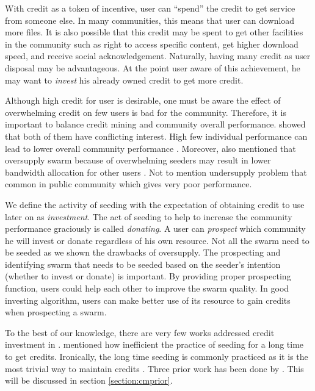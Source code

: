 With credit as a token of incentive, user can ``spend'' the credit to get service from someone else. In many communities, this means that user can download more files. It is also possible that this credit may be spent to get other facilities in the community such as right to access specific content, get higher download speed, and receive social acknowledgement. Naturally, having many credit as user disposal may be advantageous. At the point user aware of this achievement, he may want to \textit{invest} his already owned credit to get more credit.

Although high credit for user is desirable, one must be aware the effect of overwhelming credit on few users is bad for the community. Therefore, it is important to balance credit mining and community overall performance. \citeauthor{2015:sustainabilitypt:vinko} showed that both of them have conflicting interest. High few individual performance can lead to lower overall community performance \cite{2015:sustainabilitypt:vinko}. Moreover, \cite{2013:survivepriv:jia} also mentioned that oversupply swarm because of overwhelming seeders may result in lower bandwidth allocation for other users \cite{2013:survivepriv:jia}. Not to mention undersupply problem that common in public community which gives very poor performance.

We define the activity of seeding with the expectation of obtaining credit to use later on as \textit{investment}. The act of seeding to help to increase the community performance graciously is called \textit{donating}. A user can \textit{prospect} which community he will invest or donate regardless of his own resource. Not all the swarm need to be seeded as we shown the drawbacks of oversupply. The prospecting and identifying swarm that needs to be seeded based on the seeder's intention (whether to invest or donate) is important. By providing proper prospecting function, users could help each other to improve the swarm quality. In good investing algorithm, users can make better use of its resource to gain credits when prospecting a swarm. 

To the best of our knowledge, there are very few works addressed credit investment in \bt. \citeauthor{2013:survivepriv:jia} mentioned how inefficient the practice of seeding for a long time to get credits. Ironically, the long time seeding is commonly practiced as it is the most trivial way to maintain credits \cite{2013:survivepriv:jia}. Three prior work has been done by \citeauthor{2015:creditmining:capota} \cite{2015:creditmining:capota, 2013:investmentcm:capota, 2014:bwmarket:capota}. This will be discussed in section \ref{section:cmprior}. 

